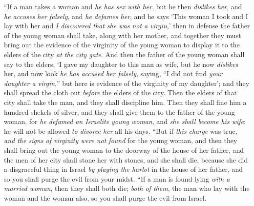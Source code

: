 \begin{biblechapter}
\verse “If a man takes a woman and \textit{he has sex with her}, but he then \textit{dislikes her},
\verse and \textit{he accuses her falsely}, and \textit{he defames her}, and he says ‘This woman I took and I lay with her and \textit{I discovered that she was not a virgin},’
\verse then in defense the father of the young woman shall take, along with her mother, and together they must bring out the evidence of the virginity of the young woman to display it to the elders of the city \textit{at the city gate}.
\verse And then the father of the young woman shall say to the elders, ‘I gave my daughter to this man as wife, but he now \textit{dislikes} her,
\verse and now look \textit{he has accused her falsely}, saying, “I did not find \textit{your daughter a virgin},” but here is evidence of the virginity of my daughter’; and they shall spread the cloth out \textit{before} the elders of the city.
\verse Then the elders of that city shall take the man, and they shall discipline him.
\verse Then they shall fine him a hundred shekels of silver, and they shall give them to the father of the young woman, for \textit{he defamed an Israelite young woman}, and \textit{she shall become his wife}; he will not be allowed \textit{to divorce her} all his days.
\verse “But if \textit{this charge} was true, \textit{and the signs of virginity were not found} for the young woman,
\verse and then they shall bring out the young woman to the doorway of the house of her father, and the men of her city shall stone her with stones, and she shall die, because she did a disgraceful thing in Israel \textit{by playing the harlot} in the house of her father, and so you shall purge the evil from your midst.
\verse “If a man is found lying \textit{with a married woman}, then they shall both die; \textit{both of them}, the man who lay with the woman and the woman also, so you shall purge the evil from Israel.

\end{biblechapter}

